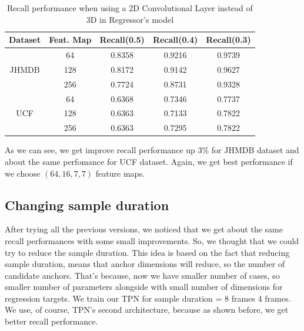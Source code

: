 
\begin{table}[h]
  \centering
  \begin{tabular}{||c | c || c  c  c||}
    \hline
    \textbf{Dataset}  & \textbf{Feat. Map} & \textbf{Recall(0.5)} & \textbf{Recall(0.4)} & \textbf{Recall(0.3)}\\
    \hline
    \multirow{3}{*}{JHMDB} & 64 & 0.8358 & 0.9216 & 0.9739\\
    \cline{2-5}
    {} & 128 & 0.8172 & 0.9142 & 0.9627 \\
    \cline{2-5}
    {} & 256 & 0.7724 & 0.8731 & 0.9328 \\
    \hline
    \multirow{3}{*}{UCF} & 64 & 0.6368 & 0.7346 & 0.7737 \\ 
    \cline{2-5}
    {} & 128 & 0.6363 & 0.7133 & 0.7822 \\
    \cline{2-5}
    {} & 256 &  0.6363 & 0.7295 & 0.7822 \\
    \hline

  \end{tabular}
  \caption{Recall performance when using a 2D Convolutional Layer instead of 3D in Regressor's model}
  \label{table:reg_2_2}
\end{table}

As we can see, we get improve recall performance up 3\% for JHMDB dataset and about the same perfomance for UCF dataset. Again, we get best performance
if we choose $(64, 16, 7, 7)$ feature maps.

\subsection{Changing sample duration}
After trying all the previous versions, we noticed that we get about the same recall performances with some small improvements. So, we thought that we could try
to reduce the sample duration. This idea is based on the fact that reducing sample duration, means that anchor dimensions will reduce, so the number of
candidate anchors. That's because, now we have smaller number of cases, so smaller number of parameters alongside with small number of dimensions for regression targets.
We train our TPN for sample duration = 8 frames 4 frames. We use, of course, TPN's second  architecture, because as shown before, we get better recall performance.

